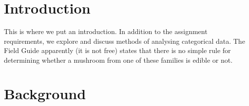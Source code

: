 \documentclass[12pt]{book}
\begin{document}

\tableofcontents
\pagebreak

\chapter{Introduction}
This is where we put an introduction.
In addition to the assignment requirements, we explore and discuss methods of analysing categorical data.
The Field Guide apparently (it is not free) states that there is no simple rule for determining whether a mushroom from one of these families is edible or not.

\chapter{Background}
\end{document}
